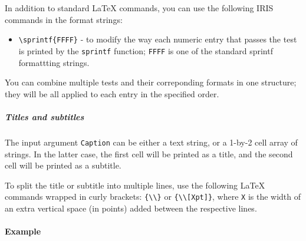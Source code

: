 In addition to standard LaTeX commands, you can use the following IRIS
commands in the format strings:

\begin{itemize}
\itemsep1pt\parskip0pt
\item
  \texttt{\textbackslash{}sprintf\{FFFF\}} - to modify the way each
  numeric entry that passes the test is printed by the \texttt{sprintf}
  function; \texttt{FFFF} is one of the standard sprintf formattting
  strings.
\end{itemize}

You can combine multiple tests and their correponding formats in one
structure; they will be all applied to each entry in the specified
order.

\subparagraph{Titles and subtitles}

The input argument \texttt{Caption} can be either a text string, or a
1-by-2 cell array of strings. In the latter case, the first cell will be
printed as a title, and the second cell will be printed as a subtitle.

To split the title or subtitle into multiple lines, use the following
LaTeX commands wrapped in curly brackets:
\texttt{\{\textbackslash{}\textbackslash{}\}} or
\texttt{\{\textbackslash{}\textbackslash{}{[}Xpt{]}\}}, where \texttt{X}
is the width of an extra vertical space (in points) added between the
respective lines.

\paragraph{Example}


